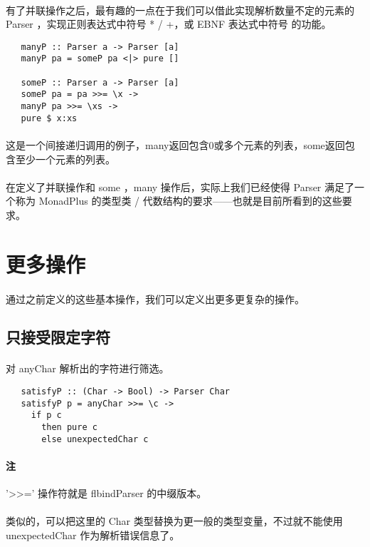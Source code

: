 \documentclass{article}
\begin{document}
   \paragraph{}
   有了并联操作之后，最有趣的一点在于我们可以借此实现解析数量不定的元素的 Parser ，实现正则表达式中符号 * / +，或 EBNF 表达式中符号 {} 的功能。
   \begin{lstlisting}
   manyP :: Parser a -> Parser [a]
   manyP pa = someP pa <|> pure []
   
   someP :: Parser a -> Parser [a]
   someP pa = pa >>= \x ->
   manyP pa >>= \xs ->
   pure $ x:xs
   \end{lstlisting}
   \paragraph{}
   这是一个间接递归调用的例子，many返回包含0或多个元素的列表，some返回包含至少一个元素的列表。
   \paragraph{}
   在定义了并联操作和 some ，many 操作后，实际上我们已经使得 Parser 满足了一个称为 MonadPlus 的类型类 / 代数结构的要求——也就是目前所看到的这些要求。 
 \section{更多操作}
   \paragraph{}
    通过之前定义的这些基本操作，我们可以定义出更多更复杂的操作。
  \subsection{只接受限定字符}
   \paragraph{}
    对 anyChar 解析出的字符进行筛选。
   \begin{lstlisting}
   satisfyP :: (Char -> Bool) -> Parser Char
   satisfyP p = anyChar >>= \c ->
     if p c 
       then pure c
       else unexpectedChar c
   \end{lstlisting}
   \paragraph{注}
    '>>=' 操作符就是 flbindParser 的中缀版本。
   \paragraph{}
    类似的，可以把这里的 Char 类型替换为更一般的类型变量，不过就不能使用 unexpectedChar 作为解析错误信息了。
\end{document}

